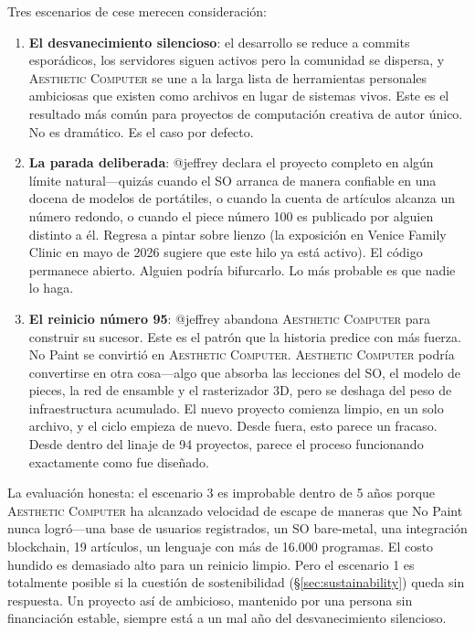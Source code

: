 \documentclass[10pt,letterpaper,twocolumn]{article}
\newcommand{\ac}{\textsc{Aesthetic Computer}}
\begin{document}
Tres escenarios de cese merecen consideración:

\begin{enumerate}
  \item \textbf{El desvanecimiento silencioso}: el desarrollo se reduce a commits esporádicos, los servidores siguen activos pero la comunidad se dispersa, y \ac{} se une a la larga lista de herramientas personales ambiciosas que existen como archivos en lugar de sistemas vivos. Este es el resultado más común para proyectos de computación creativa de autor único. No es dramático. Es el caso por defecto.

  \item \textbf{La parada deliberada}: @jeffrey declara el proyecto completo en algún límite natural---quizás cuando el SO arranca de manera confiable en una docena de modelos de portátiles, o cuando la cuenta de artículos alcanza un número redondo, o cuando el piece número 100 es publicado por alguien distinto a él. Regresa a pintar sobre lienzo (la exposición en Venice Family Clinic en mayo de 2026 sugiere que este hilo ya está activo). El código permanece abierto. Alguien podría bifurcarlo. Lo más probable es que nadie lo haga.

  \item \textbf{El reinicio número 95}: @jeffrey abandona \ac{} para construir su sucesor. Este es el patrón que la historia predice con más fuerza. No Paint se convirtió en \ac{}. \ac{} podría convertirse en otra cosa---algo que absorba las lecciones del SO, el modelo de pieces, la red de ensamble y el rasterizador 3D, pero se deshaga del peso de infraestructura acumulado. El nuevo proyecto comienza limpio, en un solo archivo, y el ciclo empieza de nuevo. Desde fuera, esto parece un fracaso. Desde dentro del linaje de 94 proyectos, parece el proceso funcionando exactamente como fue diseñado.
\end{enumerate}

La evaluación honesta: el escenario 3 es improbable dentro de 5 años porque \ac{} ha alcanzado velocidad de escape de maneras que No Paint nunca logró---una base de usuarios registrados, un SO bare-metal, una integración blockchain, 19 artículos, un lenguaje con más de 16.000 programas. El costo hundido es demasiado alto para un reinicio limpio. Pero el escenario 1 es totalmente posible si la cuestión de sostenibilidad (\S\ref{sec:sustainability}) queda sin respuesta. Un proyecto así de ambicioso, mantenido por una persona sin financiación estable, siempre está a un mal año del desvanecimiento silencioso.
\end{document}
